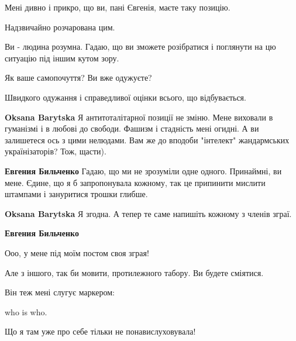 \begin{itemize}
Мені дивно і прикро, що ви, пані Євгенія, маєте таку позицію.

Надзвичайно розчарована цим.

Ви - людина розумна. Гадаю, що ви зможете розібратися і поглянути на цю ситуацію під іншим кутом зору.

Як ваше самопочуття? Ви вже одужуєте?

Швидкого одужання і справедливої оцінки всього, що відбувається.

\begin{itemize}

 
\textbf{Oksana Barytska} Я антитоталітарної позиції не зміню. Мене виховали в гуманізмі і в любові до свободи. Фашизм і стадність мені огидні. А ви залишетеся ось з цими нелюдами. Вам же до вподоби "інтелект" жандармських українізаторів? Тож, щасти).

 
\textbf{Евгения Бильченко} Гадаю, що ми не зрозуміли одне одного. Принаймні, ви мене.
Єдине, що я б запропонувала кожному, так це припинити мислити штампами і зануритися трошки глибше.

 
\textbf{Oksana Barytska} Я згодна. А тепер те саме напишіть кожному з членів зграї.

 
\textbf{Евгения Бильченко} 

Ооо, у мене під моїм постом своя зграя!

Але з іншого, так би мовити, протилежного табору. Ви будете сміятися.

Він теж мені слугує маркером:

who is who.

Що я там уже про себе тільки не понавислуховувала! \Smiley[1.0][yellow]

 

\end{itemize}
\end{itemize}
